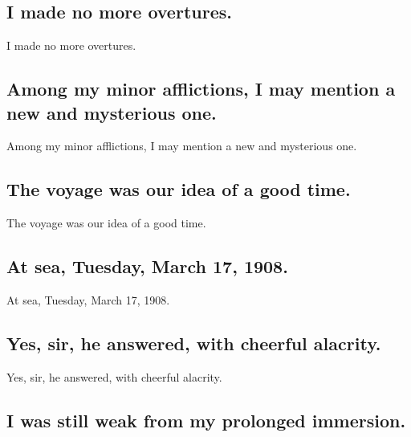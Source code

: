 \documentclass[]{article}
\begin{document}
\hypertarget{i-made-no-more-overtures.}{%
\subsection{I made no more overtures.}\label{i-made-no-more-overtures.}}

I made no more overtures.

\hypertarget{among-my-minor-afflictions-i-may-mention-a-new-and-mysterious-one.}{%
\subsection{Among my minor afflictions, I may mention a new and
mysterious
one.}\label{among-my-minor-afflictions-i-may-mention-a-new-and-mysterious-one.}}

Among my minor afflictions, I may mention a new and mysterious one.

\hypertarget{the-voyage-was-our-idea-of-a-good-time.}{%
\subsection{The voyage was our idea of a good
time.}\label{the-voyage-was-our-idea-of-a-good-time.}}

The voyage was our idea of a good time.

\hypertarget{at-sea-tuesday-march-17-1908.}{%
\subsection{At sea, Tuesday, March 17,
1908.}\label{at-sea-tuesday-march-17-1908.}}

At sea, Tuesday, March 17, 1908.

\hypertarget{yes-sir-he-answered-with-cheerful-alacrity.}{%
\subsection{Yes, sir, he answered, with cheerful
alacrity.}\label{yes-sir-he-answered-with-cheerful-alacrity.}}

Yes, sir, he answered, with cheerful alacrity.

\hypertarget{i-was-still-weak-from-my-prolonged-immersion.}{%
\subsection{I was still weak from my prolonged
immersion.}\label{i-was-still-weak-from-my-prolonged-immersion.}}
\end{document}
